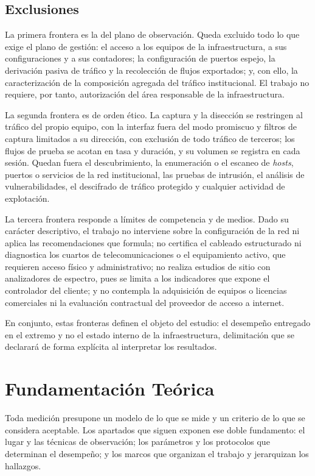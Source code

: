 \subsection*{Exclusiones}

La primera frontera es la del plano de observación. Queda excluido todo lo que exige el plano de gestión: el acceso a los equipos de la infraestructura, a sus configuraciones y a sus contadores; la configuración de puertos espejo, la derivación pasiva de tráfico y la recolección de flujos exportados; y, con ello, la caracterización de la composición agregada del tráfico institucional. El trabajo no requiere, por tanto, autorización del área responsable de la infraestructura.

La segunda frontera es de orden ético. La captura y la disección se restringen al tráfico del propio equipo, con la interfaz fuera del modo promiscuo y filtros de captura limitados a su dirección, con exclusión de todo tráfico de terceros; los flujos de prueba se acotan en tasa y duración, y su volumen se registra en cada sesión. Quedan fuera el descubrimiento, la enumeración o el escaneo de \textit{hosts}, puertos o servicios de la red institucional, las pruebas de intrusión, el análisis de vulnerabilidades, el descifrado de tráfico protegido y cualquier actividad de explotación.

La tercera frontera responde a límites de competencia y de medios. Dado su carácter descriptivo, el trabajo no interviene sobre la configuración de la red ni aplica las recomendaciones que formula; no certifica el cableado estructurado ni diagnostica los cuartos de telecomunicaciones o el equipamiento activo, que requieren acceso físico y administrativo; no realiza estudios de sitio con analizadores de espectro, pues se limita a los indicadores que expone el controlador del cliente; y no contempla la adquisición de equipos o licencias comerciales ni la evaluación contractual del proveedor de acceso a internet.

En conjunto, estas fronteras definen el objeto del estudio: el desempeño entregado en el extremo y no el estado interno de la infraestructura, delimitación que se declarará de forma explícita al interpretar los resultados.

\section{Fundamentación Teórica}

Toda medición presupone un modelo de lo que se mide y un criterio de lo que se considera aceptable. Los apartados que siguen exponen ese doble fundamento: el lugar y las técnicas de observación; los parámetros y los protocolos que determinan el desempeño; y los marcos que organizan el trabajo y jerarquizan los hallazgos.

